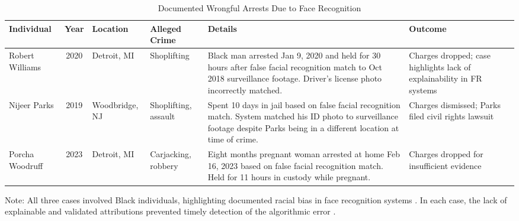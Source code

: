 
\begin{table}[htbp]
\centering
\caption{Documented Wrongful Arrests Due to Face Recognition}
\label{tab:wrongful_arrests}
\small
\begin{tabularx}{\textwidth}{>{\raggedright\arraybackslash}p{}cp{}p{}X>{\raggedright\arraybackslash}p{}}
\toprule
\textbf{Individual} & \textbf{Year} & \textbf{Location} & \textbf{Alleged Crime} & \textbf{Details} & \textbf{Outcome} \\
\midrule
Robert Williams & 2020 & Detroit, MI & Shoplifting & Black man arrested Jan 9, 2020 and held for 30 hours after false facial recognition match to Oct 2018 surveillance footage. Driver's license photo incorrectly matched. & Charges dropped; case highlights lack of explainability in FR systems \cite{hill2020detroit} \\[8pt]

Nijeer Parks & 2019 & Woodbridge, NJ & Shoplifting, assault & Spent 10 days in jail based on false facial recognition match. System matched his ID photo to surveillance footage despite Parks being in a different location at time of crime. & Charges dismissed; Parks filed civil rights lawsuit \cite{parks2019wrongful} \\[8pt]

Porcha Woodruff & 2023 & Detroit, MI & Carjacking, robbery & Eight months pregnant woman arrested at home Feb 16, 2023 based on false facial recognition match. Held for 11 hours in custody while pregnant. & Charges dropped for insufficient evidence \cite{hill2023pregnant} \\
\bottomrule
\end{tabularx}
\begin{tablenotes}
\small
\item Note: All three cases involved Black individuals, highlighting documented racial bias in face recognition systems \cite{buolamwini2018gender,grother2019frvt}. In each case, the lack of explainable and validated attributions prevented timely detection of the algorithmic error \cite{nrc2009strengthening}.
\end{tablenotes}
\end{table}

